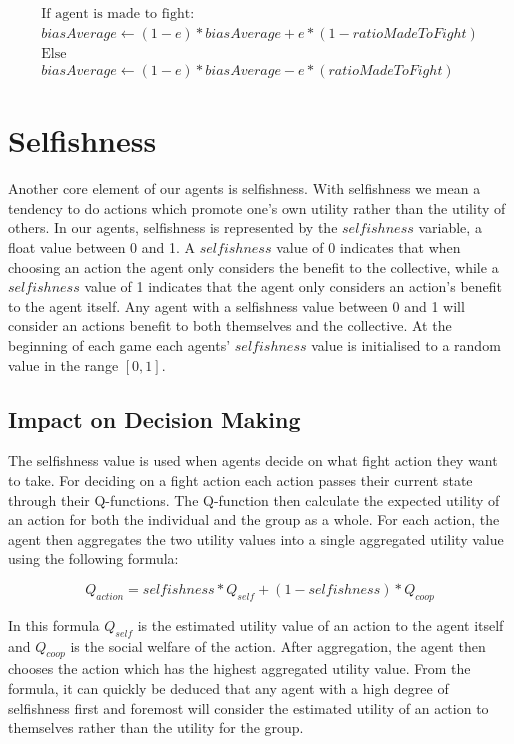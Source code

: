 \begin{align*}
\text{If agent is made to fight:} \\
biasAverage \leftarrow (1-e)*biasAverage + e*(1-ratioMadeToFight) \\
\text{Else} \\
biasAverage \leftarrow (1-e)*biasAverage - e*(ratioMadeToFight)
\end{align*}

\section{Selfishness}

Another core element of our agents is selfishness. With selfishness we mean a tendency to do actions which promote one's own utility rather than the utility of others. In our agents, selfishness is represented by the $selfishness$ variable, a float value between 0 and 1. A $selfishness$ value of 0 indicates that when choosing an action the agent only considers the benefit to the collective, while a $selfishness$ value of 1 indicates that the agent only considers an action's benefit to the agent itself. Any agent with a selfishness value between 0 and 1 will consider an actions benefit to both themselves and the collective. At the beginning of each game each agents' $selfishness$ value is initialised to a random value in the range $[0,1]$. 


\subsection{Impact on Decision Making}

The selfishness value is used when agents decide on what fight action they want to take. For deciding on a fight action each action passes their current state through their Q-functions. The Q-function then calculate the expected utility of an action for both the individual and the group as a whole. For each action, the agent then aggregates the two utility values into a single aggregated utility value using the following formula:

\begin{equation}
    Q_{action} = selfishness*Q_{self} + (1 - selfishness)*Q_{coop}
\end{equation}

In this formula $Q_{self}$ is the estimated utility value of an action to the agent itself and $Q_{coop}$ is the social welfare of the action. After aggregation, the agent then chooses the action which has the highest aggregated utility value. From the formula, it can quickly be deduced that any agent with a high degree of selfishness first and foremost will consider the estimated utility of an action to themselves rather than the utility for the group.

